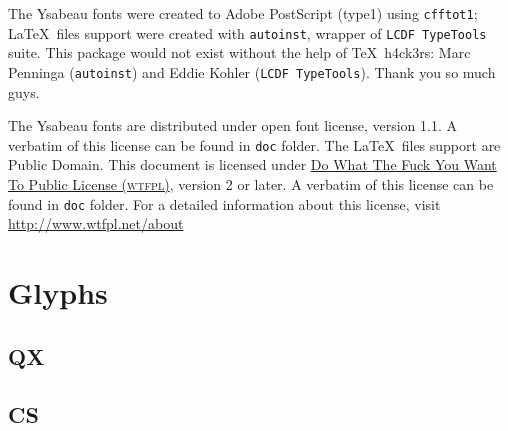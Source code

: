 \documentclass[12pt,letterpaper,twoside,final]{article}
\begin{document}
The Ysabeau fonts were created to Adobe PostScript (type1) using \texttt{cfftot1}; \LaTeX\ files support were created with \texttt{autoinst}, wrapper of \texttt{LCDF TypeTools} suite. This package would not exist without the help of \TeX\ h4ck3rs: Marc Penninga (\texttt{autoinst}) and Eddie Kohler (\texttt{LCDF TypeTools}). Thank you so much guys.

The Ysabeau fonts are distributed under  open font license, version 1.1. A verbatim of this license can be found in \texttt{doc} folder. The \LaTeX\ files support are Public Domain. This document is licensed under \href{http://www.wtfpl.net}{Do What The Fuck You Want To Public License (\textsc{wtfpl})}, version 2 or later. A verbatim of this license can be found in \texttt{doc} folder. For a detailed information about this license, visit \url{http://www.wtfpl.net/about}
\section{Glyphs}\label{sec:glyphs}
\subsection{QX}
\subsection{}
\subsection{CS}
\subsection{}
\subsection{}
\subsection{}
\subsection{}
\end{document}
